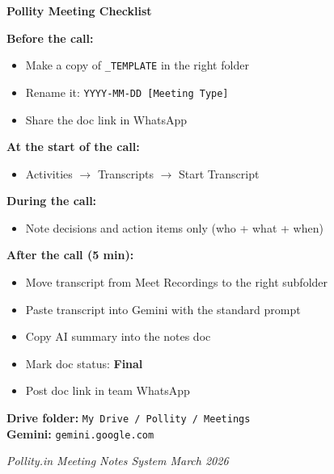 \documentclass[11pt, a4paper]{article}
\begin{document}
\begin{tcolorbox}[colback=pollityblue!10, colframe=pollityblue, sharp corners, breakable]
\begin{center}
\large\bfseries\color{pollityblue} Pollity Meeting Checklist
\end{center}

\vspace{0.5em}

\textbf{Before the call:}
\begin{itemize}[leftmargin=1.5em, itemsep=2pt]
  \item[$\square$] Make a copy of \texttt{\_TEMPLATE} in the right folder
  \item[$\square$] Rename it: \texttt{YYYY-MM-DD [Meeting Type]}
  \item[$\square$] Share the doc link in WhatsApp
\end{itemize}

\vspace{0.5em}

\textbf{At the start of the call:}
\begin{itemize}[leftmargin=1.5em, itemsep=2pt]
  \item[$\square$] Activities $\to$ Transcripts $\to$ Start Transcript
\end{itemize}

\vspace{0.5em}

\textbf{During the call:}
\begin{itemize}[leftmargin=1.5em, itemsep=2pt]
  \item[$\square$] Note decisions and action items only (who + what + when)
\end{itemize}

\vspace{0.5em}

\textbf{After the call (5 min):}
\begin{itemize}[leftmargin=1.5em, itemsep=2pt]
  \item[$\square$] Move transcript from Meet Recordings to the right subfolder
  \item[$\square$] Paste transcript into Gemini with the standard prompt
  \item[$\square$] Copy AI summary into the notes doc
  \item[$\square$] Mark doc status: \textbf{Final}
  \item[$\square$] Post doc link in team WhatsApp
\end{itemize}

\vspace{1em}
\begin{center}
\textbf{Drive folder:} \texttt{My Drive / Pollity / Meetings}\\[0.3em]
\textbf{Gemini:} \texttt{gemini.google.com}
\end{center}
\end{tcolorbox}

\vfill
\begin{center}
{\color{gray}\small\textit{Pollity.in \textbar{} Meeting Notes System \textbar{} March 2026}}
\end{center}
\end{document}
